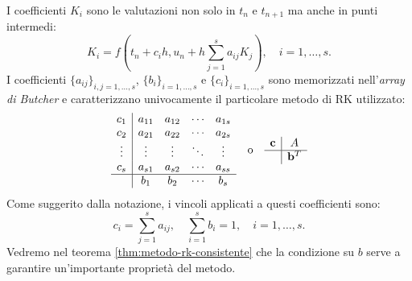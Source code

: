 I coefficienti $K_{i}$ sono le valutazioni non solo in $t_{n}$ e $t_{n+1}$ ma anche in punti intermedi:
\begin{equation}
K_{i} =f\left( t_{n} +c_{i} h,u_{n} +h\sum\limits ^{s}_{j=1} a_{ij} K_{j}\right) ,\quad i=1,\dotsc ,s.
\end{equation}
I coefficienti $\{a_{ij}\}_{i,j=1,\dotsc ,s}$, $\{b_{i}\}_{i=1,\dotsc ,s}$ e $\{c_{i}\}_{i=1,\dotsc ,s}$ sono memorizzati nell'\textit{array di Butcher} e caratterizzano univocamente il particolare metodo di RK utilizzato:
\begin{equation}
\begin{array}{ c|c c c c }
c_{1} & a_{11} & a_{12} & \cdots  & a_{1s}\\
c_{2} & a_{21} & a_{22} & \cdots  & a_{2s}\\
\vdots  & \vdots  & \vdots  & \ddots  & \vdots \\
c_{s} & a_{s1} & a_{s2} & \cdots  & a_{ss}\\
\hline
 & b_{1} & b_{2} & \cdots  & b_{s}
\end{array} \quad \text{o} \quad \begin{array}{ c|c }
\mathbf{c} & A\\
\hline
 & \mathbf{b}^{T}
\end{array}
\end{equation}
Come suggerito dalla notazione, i vincoli applicati a questi coefficienti sono:
\begin{equation}
c_{i} =\sum\limits ^{s}_{j=1} a_{ij} ,\quad \sum\limits ^{s}_{i=1} b_{i} =1,\quad i=1,\dotsc ,s.
\end{equation}
\label{eq:ipotesi-rk}
Vedremo nel teorema \ref{thm:metodo-rk-consistente} che la condizione su $b$ serve a garantire un'importante proprietà del metodo.

